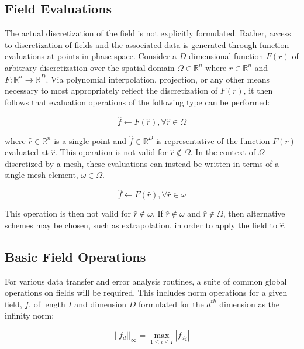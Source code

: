 \documentclass[letterpaper,12pt]{article}
\begin{document}
\subsection{Field Evaluations}\label{subsec:field_eval}
The actual discretization of the field is not explicitly
formulated. Rather, access to discretization of fields and the
associated data is generated through function evaluations at points in
phase space. Consider a $D$-dimensional function $F(r)$ of arbitrary
discretization over the spatial domain $\Omega \in \mathbb{R}^n$ where
$r \in \mathbb{R}^n$ and $F : \mathbb{R}^n \rightarrow
\mathbb{R}^D$. Via polynomial interpolation, projection, or any other
means necessary to most appropriately reflect the discretization of
$F(r)$, it then follows that evaluation operations of the following
type can be performed:

\begin{equation}
  \hat{f} \leftarrow F(\hat{r}), \forall \hat{r} \in \Omega
  \label{eq:evaluation}
\end{equation}

where $\hat{r} \in \mathbb{R}^n$ is a single point and $\hat{f} \in
\mathbb{R}^D$ is representative of the function $F(r)$ evaluated at
$\hat{r}$. This operation is not valid for $\hat{r} \notin \Omega$. In
the context of $\Omega$ discretized by a mesh, these evaluations can
instead be written in terms of a single mesh element, $\omega \in
\Omega$. 

\begin{equation}
  \hat{f} \leftarrow F(\hat{r}), \forall \hat{r} \in \omega
  \label{eq:element_evaluation}
\end{equation}

This operation is then not valid for $\hat{r} \notin \omega$. If
$\hat{r} \notin \omega$ and $\hat{r} \notin \Omega$, then alternative
schemes may be chosen, such as extrapolation, in order to apply the
field to $\hat{r}$.


\subsection{Basic Field Operations}\label{subsec:field_ops}
For various data transfer and error analysis routines, a suite of
common global operations on fields will be required. This includes
norm operations for a given field, $f$, of length $I$ and dimension
$D$ formulated for the $d^{th}$ dimension as the infinity norm:

\begin{equation}
  ||f_d||_\infty = \max_{1 \leq i \leq I} |{f_d}_i|
  \label{eq:infinity_norm}
\end{equation}
\end{document}
